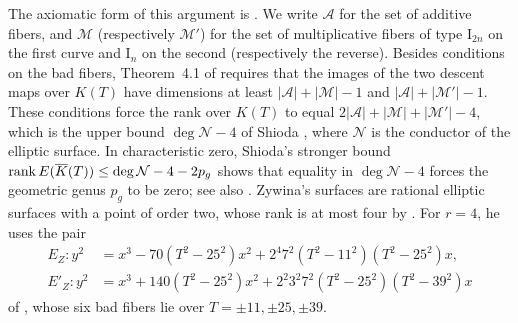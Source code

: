 The axiomatic form of this argument is \cite[Theorem~4.1]{Zywina2026}. We write $\mathcal A$ for the set of additive fibers, and $\mathcal M$ (respectively $\mathcal M'$) for the set of multiplicative fibers of type $\mathrm I_{2n}$ on the first curve and $\mathrm I_n$ on the second (respectively the reverse). Besides conditions on the bad fibers, Theorem~4.1 of \cite{Zywina2026} requires that the images of the two descent maps over $K(T)$ have dimensions at least $|\mathcal A|+|\mathcal M|-1$ and $|\mathcal A|+|\mathcal M'|-1$. These conditions force the rank over $K(T)$ to equal $2|\mathcal A|+|\mathcal M|+|\mathcal M'|-4$, which is the upper bound $\deg\mathcal N-4$ of Shioda \cite[Corollary~2]{Shioda1992}, where $\mathcal N$ is the conductor of the elliptic surface. In characteristic zero, Shioda's stronger bound $\operatorname{rank} E(\overline K(T))\le\deg\mathcal N-4-2p_g$ \cite[Corollary~3, equation~(1.13')]{Shioda1992} shows that equality in $\deg\mathcal N-4$ forces the geometric genus $p_g$ to be zero; see also \cite[\S2]{Zywina2026}. Zywina's surfaces are rational elliptic surfaces with a point of order two, whose rank is at most four by \cite[Corollary~2.1]{OguisoShioda1991}. For $r=4$, he uses the pair
\begin{equation}\label{eq:intro-zywina}
\begin{aligned}
E_Z\colon y^2&=x^3-70(T^2-25^2)x^2+2^4 7^2(T^2-11^2)(T^2-25^2)x,\\
E'_Z\colon y^2&=x^3+140(T^2-25^2)x^2+2^2 3^2 7^2(T^2-25^2)(T^2-39^2)x
\end{aligned}
\end{equation}
of \cite[\S6.5]{Zywina2026}, whose six bad fibers lie over $T=\pm11,\pm25,\pm39$.

